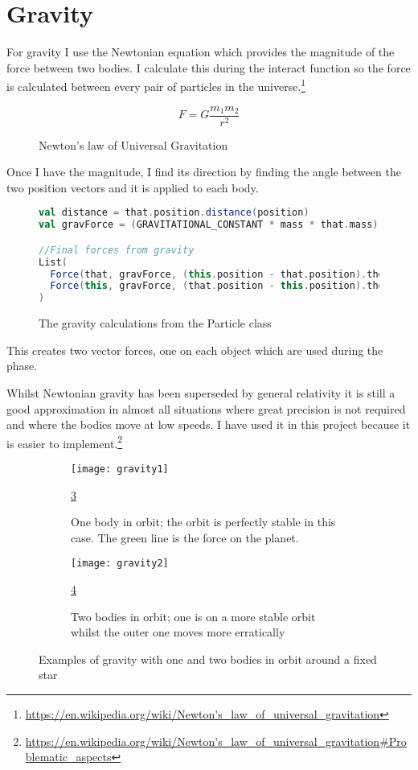 	\section{Gravity}
	For gravity I use the Newtonian equation which provides the magnitude of the force between two bodies. I calculate this during the interact function so the force is calculated between every pair of particles in the universe.\footnote{\url{https://en.wikipedia.org/wiki/Newton's_law_of_universal_gravitation}}
	\begin{figure}[h]
		\begin{equation}
		F = G\frac{m_{1}m_{2}}{r^{2}}
		\end{equation}
		\caption{Newton's law of Universal Gravitation}
		\label{fig:gravEqn}
	\end{figure}
	
	Once I have the magnitude, I find its direction by finding the angle between the two position vectors and it is applied to each body.
	\begin{figure}[h]
		\centering
		\begin{lstlisting}[language=Scala]
val distance = that.position.distance(position)
val gravForce = (GRAVITATIONAL_CONSTANT * mass * that.mass) / Math.pow(distance, 2)

//Final forces from gravity
List(
  Force(that, gravForce, (this.position - that.position).theta),
  Force(this, gravForce, (that.position - this.position).theta)
)
		\end{lstlisting}
		\caption{The gravity calculations from the Particle class}
		\label{fig:gravCode}
	\end{figure}

	This creates two vector forces, one on each object which are used during the  phase.
	
	Whilst Newtonian gravity has been superseded by general relativity it is still a good approximation in almost all situations where great precision is not required and where the bodies move at low speeds. I have used it in this project because it is easier to implement.\footnote{\url{https://en.wikipedia.org/wiki/Newton's_law_of_universal_gravitation\#Problematic_aspects}}
	
	\begin{figure}[p]
		\centering
		\begin{subfigure}{0.9\textwidth}
			\centering
			\texttt{[image: gravity1]}
			\caption{One body in orbit; the orbit is perfectly stable in this case. The green line is the force on the planet.}
			\label{fig:gravExamplesSub1}
			\ref{fig:gravExamplesSub1}
		\end{subfigure}
		\begin{subfigure}{0.9\textwidth}
			\centering
			\texttt{[image: gravity2]}
			\caption{Two bodies in orbit; one is on a more stable orbit whilst the outer one moves more erratically} 
			\label{fig:gravExamplesSub2}
			\ref{fig:gravExamplesSub2}
		\end{subfigure}	
		\caption{Examples of gravity with one and two bodies in orbit around a fixed star}
		\label{fig:gravExamples}
	\end{figure}